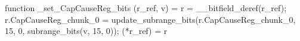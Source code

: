 function _set_CapCauseReg_bits (r_ref, v) = {
    r = __bitfield_deref(r_ref);
    r.CapCauseReg_chunk_0 = update_subrange_bits(r.CapCauseReg_chunk_0, 15, 0, subrange_bits(v, 15, 0));
    (*r_ref) = r
}
